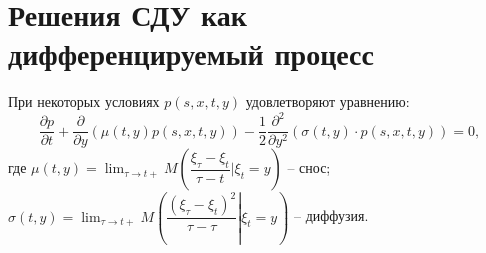 \section{Решения СДУ как дифференцируемый процесс}

\begin{theorem}
  При некоторых условиях $p(s, x, t, y)$ удовлетворяют уравнению:
  \[
    \dfrac{\partial p}{\partial t} + \dfrac{\partial }{\partial y} \left( \mu(t, y) p(s, x, t, y) \right) -
    \dfrac{1}{2} \dfrac{\partial^2}{\partial y^2} \left( \sigma(t, y) \cdot p(s, x, t, y) \right) = 0,
  \]
  где $\mu(t, y) = \lim_{\tau \to t+} M \left( \dfrac{\xi_\tau - \xi_t}{\tau - t} | \xi_{t} = y \right) $ -- снос;
  $\sigma(t, y) = \lim_{\tau \to t+} M \left( \left. \dfrac{(\xi_\tau - \xi_t)^2}{\tau - \tau} \right| \xi_t = y \right) $ -- диффузия.
\end{theorem}


